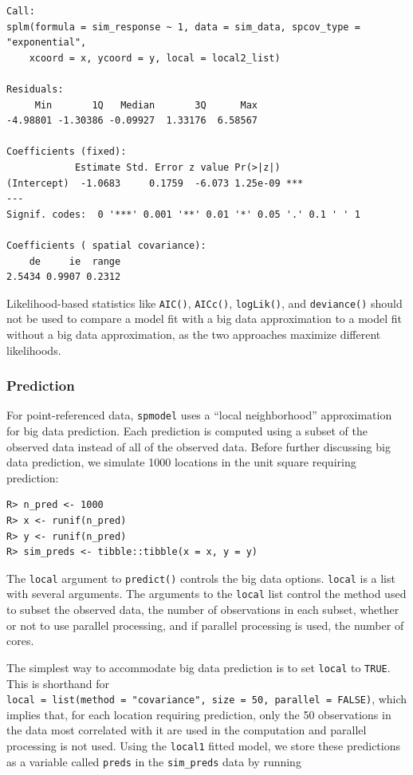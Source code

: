 \documentclass[10pt,letterpaper]{article}
\begin{document}
\begin{verbatim}
Call:
splm(formula = sim_response ~ 1, data = sim_data, spcov_type = "exponential", 
    xcoord = x, ycoord = y, local = local2_list)

Residuals:
     Min       1Q   Median       3Q      Max 
-4.98801 -1.30386 -0.09927  1.33176  6.58567 

Coefficients (fixed):
            Estimate Std. Error z value Pr(>|z|)    
(Intercept)  -1.0683     0.1759  -6.073 1.25e-09 ***
---
Signif. codes:  0 '***' 0.001 '**' 0.01 '*' 0.05 '.' 0.1 ' ' 1

Coefficients ( spatial covariance):
    de     ie  range 
2.5434 0.9907 0.2312 
\end{verbatim}

Likelihood-based statistics like \texttt{AIC()}, \texttt{AICc()},
\texttt{logLik()}, and \texttt{deviance()} should not be used to compare
a model fit with a big data approximation to a model fit without a big
data approximation, as the two approaches maximize different
likelihoods.

\hypertarget{sec:predict}{%
\subsubsection{Prediction}\label{sec:predict}}

For point-referenced data, \texttt{spmodel} uses a ``local
neighborhood'' approximation for big data prediction. Each prediction is
computed using a subset of the observed data instead of all of the
observed data. Before further discussing big data prediction, we
simulate 1000 locations in the unit square requiring prediction:

\begin{verbatim}
R> n_pred <- 1000
R> x <- runif(n_pred)
R> y <- runif(n_pred)
R> sim_preds <- tibble::tibble(x = x, y = y)
\end{verbatim}

The \texttt{local} argument to \texttt{predict()} controls the big data
options. \texttt{local} is a list with several arguments. The arguments
to the \texttt{local} list control the method used to subset the
observed data, the number of observations in each subset, whether or not
to use parallel processing, and if parallel processing is used, the
number of cores.

The simplest way to accommodate big data prediction is to set
\texttt{local} to \texttt{TRUE}. This is shorthand for
\texttt{local\ =\ list(method\ =\ "covariance",\ size\ =\ 50,\ parallel\ =\ FALSE)},
which implies that, for each location requiring prediction, only the 50
observations in the data most correlated with it are used in the
computation and parallel processing is not used. Using the
\texttt{local1} fitted model, we store these predictions as a variable
called \texttt{preds} in the \texttt{sim\_preds} data by running
\end{document}
